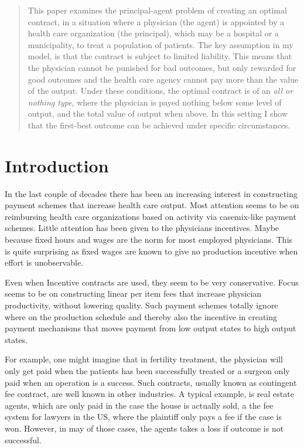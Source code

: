 


\maketitle
\begin{abstract}
	This paper examines the principal-agent problem of creating an optimal contract, in a situation where a physician (the agent) is appointed by a health care organization (the principal), which may be a hospital or a municipality, to treat a population of patients. The key assumption in my model, is that the contract is subject to limited liability. This means that the physician cannot be punished for bad outcomes, but only rewarded for good outcomes and the health care agency cannot pay more than the value of the output. Under these conditions, the optimal contract is of an \emph{all or nothing type}, where the physician is payed nothing below some level of output,  and the total value of output when above. In this setting I show that the first-best outcome can be achieved under specific circumstances. 
\end{abstract}

\section{Introduction} %
\label{sec:introduction}
In the last couple of decades there has been an increasing interest in constructing payment schemes that increase health care output. Most attention seems to be on reimbursing health care organizations based on activity via casemix-like payment schemes. Little attention has been given to the physicians incentives. Maybe because fixed hours and wages are the norm for most employed physicians. This is quite surprising as fixed wages are known to give no production incentive when effort is unobservable.  

Even when Incentive contracts are used, they seem to be very conservative. Focus seems to be on constructing linear per item fees that increase physician productivity, without lowering quality. Such payment schemes totally ignore where on the production schedule and thereby also the incentive in creating payment mechanisms that moves payment from low output states to high output states. 

For example, one might imagine that in fertility treatment, the physician will only get paid when the patients has been successfully treated or a surgeon only paid when an operation is a success. Such contracts, usually known as contingent fee contract, are well known in other industries. A typical example, is real estate agents, which are only paid in the case the house is actually sold, a the fee system for lawyers in the US, where the plaintiff only pays a fee if the case is won. However, in may of those cases, the agents takes a loss if outcome is not successful.


